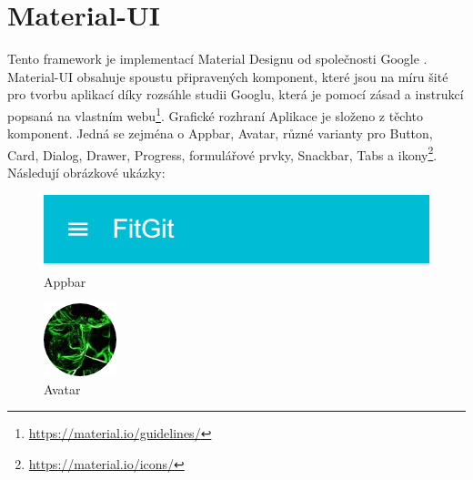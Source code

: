 \section{Material-UI}

Tento framework je implementací Material Designu od společnosti Google \cite{material-from-google}. Material-UI obsahuje spoustu připravených komponent, které jsou na míru šité pro tvorbu aplikací díky rozsáhle studii Googlu, která je pomocí zásad a instrukcí popsaná na vlastním webu\footnote{\url{https://material.io/guidelines/}}. Grafické rozhraní Aplikace je složeno z těchto komponent. Jedná se zejména o Appbar, Avatar, různé varianty pro Button, Card, Dialog, Drawer, Progress, formulářové prvky, Snackbar, Tabs a ikony\footnote{\url{https://material.io/icons/}}. Následují obrázkové ukázky:

\FloatBarrier

\begin{figure}[ht]
	\centering
	\includegraphics[scale=0.5]{sections/ui/images/Appbar.png}
	\caption{Appbar}
	\label{fig:appbar}
\end{figure}

\begin{figure}[ht]
	\centering
	\includegraphics[scale=0.5]{sections/ui/images/Avatar.png}
	\caption{Avatar}
	\label{fig:avatar}
\end{figure}

